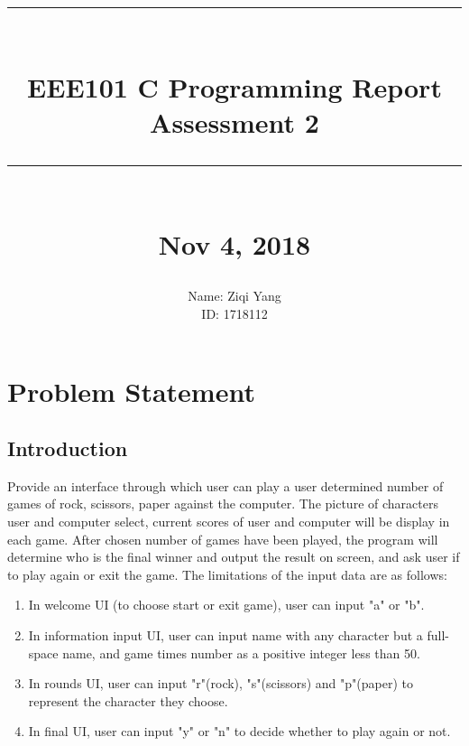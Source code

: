 \documentclass[12pt]{article}
\newcommand{\HRule}[1]{\rule{\linewidth}{#1}}
\begin{document}
	
	\title{ \normalsize \textsc{}
		\\ [2.0cm]
		\HRule{0.5pt} \\
		\LARGE \textbf{EEE101 C Programming Report\\Assessment 2}
		\HRule{2pt} \\ [0.5cm]
		\normalsize Nov 4, 2018 \vspace*{5\baselineskip}}
	
	\date{}
	
	\author{
		Name: Ziqi Yang\\
		ID: 1718112\\
	}
	
	\maketitle
	\newpage
	\tableofcontents
	\newpage
	
	
	\section{Problem Statement}
	
	\subsection{Introduction}
	Provide an interface through which user can play a user determined number of games of rock, scissors, paper against the computer. The picture of characters user and computer select, current scores of user and computer will be display in each game. After chosen number of games have been played, the program will determine who is the final winner and output the result on screen, and ask user if to play again or exit the game. The limitations of the input data are as follows:
	
	\begin{enumerate}
	\item In welcome UI (to choose start or exit game), user can input "a" or "b".
	\item In information input UI, user can input name with any character but a full-space name, and game times number as a positive integer less than 50.
	\item In rounds UI, user can input "r"(rock), "s"(scissors) and "p"(paper) to represent the character they choose.
	\item In final UI, user can input "y" or "n" to decide whether to play again or not.
	\end{enumerate}
\end{document}
